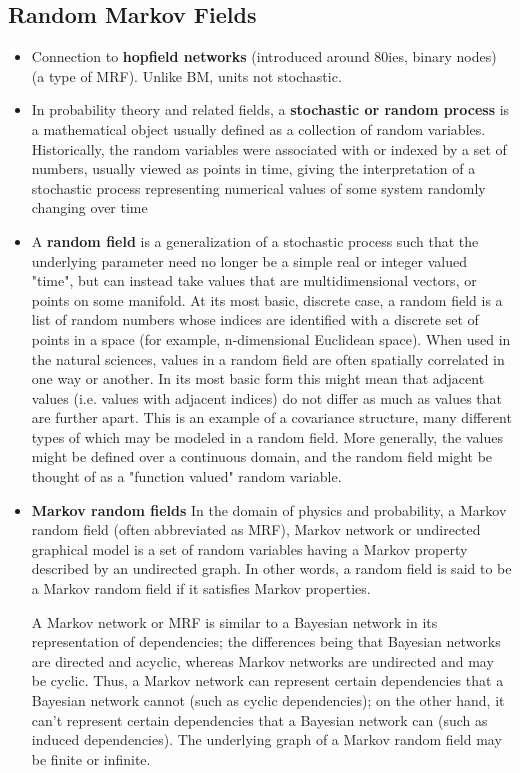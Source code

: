 \documentclass[twoside,english]{uiofysmaster}
\begin{document}
\subsection{Random Markov Fields}
\begin{itemize}
	\item Connection to \textbf{hopfield networks} (introduced around 80ies, binary nodes) (a type of MRF). Unlike BM, units not stochastic.
	\item In probability theory and related fields, a \textbf{stochastic or random process} is a mathematical object usually defined as a collection of random variables. Historically, the random variables were associated with or indexed by a set of numbers, usually viewed as points in time, giving the interpretation of a stochastic process representing numerical values of some system randomly changing over time
	\item A \textbf{random field} is a generalization of a stochastic process such that the underlying parameter need no longer be a simple real or integer valued "time", but can instead take values that are multidimensional vectors, or points on some manifold.
	At its most basic, discrete case, a random field is a list of random numbers whose indices are identified with a discrete set of points in a space (for example, n-dimensional Euclidean space). When used in the natural sciences, values in a random field are often spatially correlated in one way or another. In its most basic form this might mean that adjacent values (i.e. values with adjacent indices) do not differ as much as values that are further apart. This is an example of a covariance structure, many different types of which may be modeled in a random field. More generally, the values might be defined over a continuous domain, and the random field might be thought of as a "function valued" random variable.
	\item \textbf{Markov random fields} 
	In the domain of physics and probability, a Markov random field (often abbreviated as MRF), Markov network or undirected graphical model is a set of random variables having a Markov property described by an undirected graph. In other words, a random field is said to be a Markov random field if it satisfies Markov properties.

	A Markov network or MRF is similar to a Bayesian network in its representation of dependencies; the differences being that Bayesian networks are directed and acyclic, whereas Markov networks are undirected and may be cyclic. Thus, a Markov network can represent certain dependencies that a Bayesian network cannot (such as cyclic dependencies); on the other hand, it can't represent certain dependencies that a Bayesian network can (such as induced dependencies). The underlying graph of a Markov random field may be finite or infinite.


\end{itemize}
\end{document}
